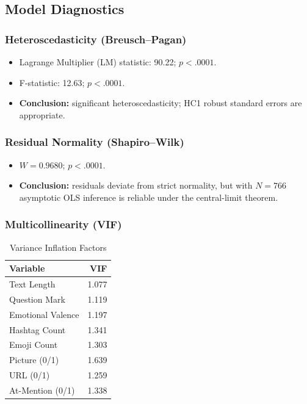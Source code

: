 \documentclass[12pt,a4paper]{article}
\begin{document}
\subsection{Model Diagnostics}
\label{sec:diag}

\subsubsection{Heteroscedasticity (Breusch--Pagan)}
\begin{itemize}
    \item Lagrange Multiplier (LM) statistic: 90.22; $p<.0001$.
    \item F-statistic: 12.63; $p<.0001$.
    \item \textbf{Conclusion:} significant heteroscedasticity; HC1 robust standard errors are appropriate.
\end{itemize}

\subsubsection{Residual Normality (Shapiro--Wilk)}
\begin{itemize}
    \item $W = 0.9680$; $p<.0001$.
    \item \textbf{Conclusion:} residuals deviate from strict normality, but with $N=766$ asymptotic OLS inference is reliable under the central-limit theorem.
\end{itemize}

\subsubsection{Multicollinearity (VIF)}

\begin{table}[H]
\centering
\caption{Variance Inflation Factors}
\small
\begin{tabular}{lr}
\toprule
Variable & VIF \\
\midrule
Text Length & 1.077 \\
Question Mark & 1.119 \\
Emotional Valence & 1.197 \\
Hashtag Count & 1.341 \\
Emoji Count & 1.303 \\
Picture (0/1) & 1.639 \\
URL (0/1) & 1.259 \\
At-Mention (0/1) & 1.338 \\
\bottomrule
\end{tabular}
\end{table}
\end{document}
